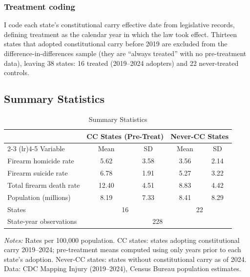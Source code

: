\documentclass[12pt]{article}
\begin{document}
\subsubsection*{Treatment coding} I code each state's constitutional carry effective date from legislative records, defining treatment as the calendar year in which the law took effect. Thirteen states that adopted constitutional carry before 2019 are excluded from the difference-in-differences sample (they are ``always treated'' with no pre-treatment data), leaving 38 states: 16 treated (2019--2024 adopters) and 22 never-treated controls.

\subsection{Summary Statistics}

\begin{table}[H]
\centering
\caption{Summary Statistics}
\begin{threeparttable}
\begin{tabular}{lcccc}
\toprule
& \multicolumn{2}{c}{CC States (Pre-Treat)} & \multicolumn{2}{c}{Never-CC States} \\
\cmidrule(lr){2-3} \cmidrule(lr){4-5}
Variable & Mean & SD & Mean & SD \\
\midrule
Firearm homicide rate & 5.62 & 3.58 & 3.56 & 2.14 \\
Firearm suicide rate & 6.78 & 1.91 & 5.27 & 3.22 \\
Total firearm death rate & 12.40 & 4.51 & 8.83 & 4.42 \\
Population (millions) & 8.19 & 7.33 & 8.41 & 8.29 \\
\midrule
States & \multicolumn{2}{c}{16} & \multicolumn{2}{c}{22} \\
State-year observations & \multicolumn{4}{c}{228} \\
\bottomrule
\end{tabular}
\begin{tablenotes}[flushleft]
\small
\item \textit{Notes:} Rates per 100,000 population. CC states: states adopting constitutional carry 2019--2024; pre-treatment means computed using only years prior to each state's adoption. Never-CC states: states without constitutional carry as of 2024. Data: CDC Mapping Injury (2019--2024), Census Bureau population estimates.
\end{tablenotes}
\end{threeparttable}
\label{tab:summary}
\end{table}
\end{document}
